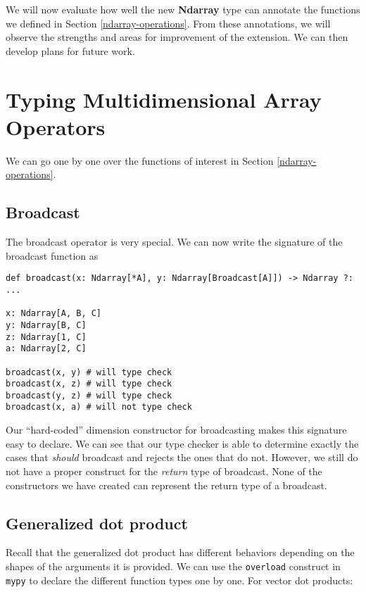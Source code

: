 \documentclass[12pt]{report}
\begin{document}
We will now evaluate how well the new \textbf{Ndarray} type can annotate the functions we defined in Section \ref{ndarray-operations}. From these annotations, we will observe the strengths and areas for improvement of the extension. We can then develop plans for future work.

\section{Typing Multidimensional Array Operators}
\label{type-examples}

We can go one by one over the functions of interest in Section \ref{ndarray-operations}.

\subsection{Broadcast}

The broadcast operator is very special. We can now write the signature of the broadcast function as

\begin{singlespace*}
\begin{verbatim}
def broadcast(x: Ndarray[*A], y: Ndarray[Broadcast[A]]) -> Ndarray ?: ...

x: Ndarray[A, B, C]
y: Ndarray[B, C]
z: Ndarray[1, C]
a: Ndarray[2, C]

broadcast(x, y) # will type check
broadcast(x, z) # will type check
broadcast(y, z) # will type check
broadcast(x, a) # will not type check\end{verbatim}
\end{singlespace*}
Our ``hard-coded'' dimension constructor for broadcasting makes this signature easy to declare. We can see that our type checker is able to determine exactly the cases that \textit{should} broadcast and rejects the ones that do not. However, we still do not have a proper construct for the \textit{return} type of broadcast. None of the constructors we have created can represent the return type of a broadcast.

\subsection{Generalized dot product}
Recall that the generalized dot product has different behaviors depending on the shapes of the arguments it is provided. We can use the \texttt{overload} construct in \texttt{mypy} to declare the different function types one by one. For vector dot products:
\end{document}
